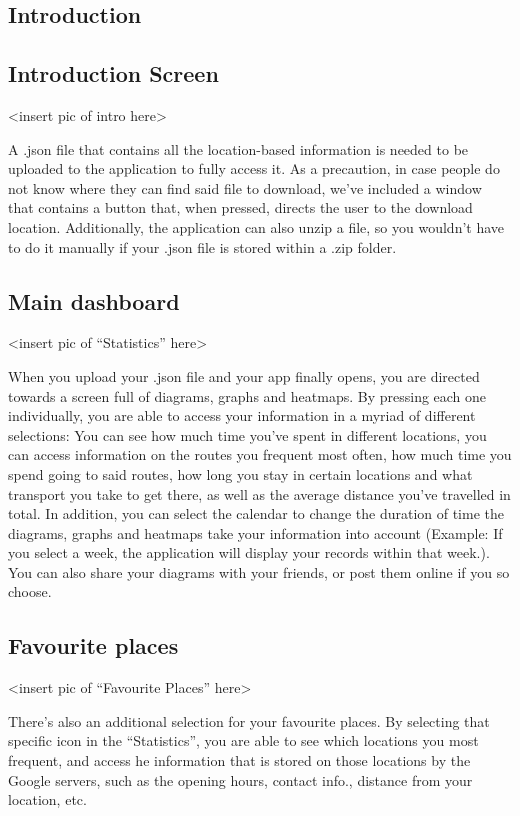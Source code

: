 \documentclass[12p]{article}
\begin{document}
		\subsection{Introduction}
		
		\subsection{Introduction Screen}
		<insert pic of intro here>
		
		A .json file that contains all the location-based information is needed to be uploaded to the application to fully access it. As a precaution, in case people do not know where they can find said file to download, we’ve included a window that contains a button that, when pressed, directs the user to the download location. Additionally, the application can also unzip a file, so you wouldn’t have to do it manually if your .json file is stored within a .zip folder.
		
		\subsection{Main dashboard}
		<insert pic of “Statistics” here>
		
		When you upload your .json file and your app finally opens, you are directed towards a screen full of diagrams, graphs and heatmaps. By pressing each one individually, you are able to access your information in a myriad of different selections: You can see how much time you’ve spent in different locations, you can access information on the routes you frequent most often, how much time you spend going to said routes, how long you stay in certain locations and what transport you take to get there, as well as the average distance you’ve travelled in total. In addition, you can select the calendar to change the duration of time the diagrams, graphs and heatmaps take your information into account (Example: If you select a week, the application will display your records within that week.). You can also share your diagrams with your friends, or post them online if you so choose.
		
		\subsection{Favourite places}
		<insert pic of “Favourite Places” here>
		
		There’s also an additional selection for your favourite places. By selecting that specific icon in the “Statistics”, you are able to see which locations you most frequent, and access he information that is stored on those locations by the Google servers, such as the opening hours, contact info., distance from your location, etc.
		
\end{document}
